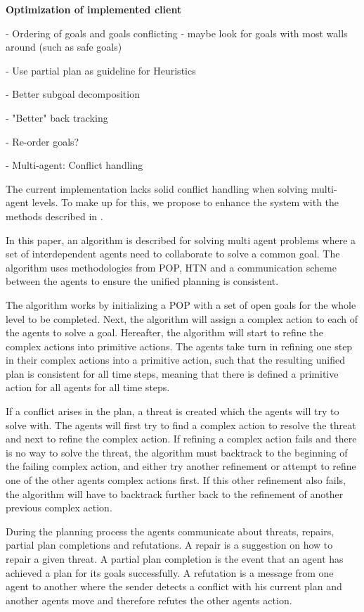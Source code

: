 \documentclass[Main]{subfiles}
\begin{document}
\textbf{Optimization of implemented client}


- Ordering of goals and goals conflicting - maybe look for goals with most walls around (such as safe goals)

- Use partial plan as guideline for Heuristics

- Better subgoal decomposition

- "Better" back tracking

- Re-order goals?

- Multi-agent: Conflict handling

The current implementation lacks solid conflict handling when solving multi-agent levels. To make up for this, we propose to enhance the system with the methods described in \cite{pellier2007unified}.

In this paper, an algorithm is described for solving multi agent problems where a set of interdependent agents need to collaborate to solve a common goal.
The algorithm uses methodologies from POP, HTN and a communication scheme between the agents to ensure the unified planning is consistent.

The algorithm works by initializing a POP with a set of open goals for the whole level to be completed. Next, the algorithm will assign a complex action to each of the agents to solve a goal.
Hereafter, the algorithm will start to refine the complex actions into primitive actions.
The agents take turn in refining one step in their complex actions into a primitive action, such that the resulting unified plan is consistent for all time steps, meaning that there is defined a primitive action for all agents for all time steps.

If a conflict arises in the plan, a threat is created which the agents will try to solve with. The agents will first try to find a complex action to resolve the threat and next to refine the complex action.
If refining a complex action fails and there is no way to solve the threat, the algorithm must backtrack to the beginning of the failing complex action, and either try another refinement or attempt to refine one of the other agents complex actions first.
If this other refinement also fails, the algorithm will have to backtrack further back to the refinement of another previous complex action.

During the planning process the agents communicate about threats, repairs, partial plan completions and refutations.
A repair is a suggestion on how to repair a given threat.
A partial plan completion is the event that an agent has achieved a plan for its goals successfully.
A refutation is a message from one agent to another where the sender detects a conflict with his current plan and another agents move and therefore refutes the other agents action.
\end{document}
